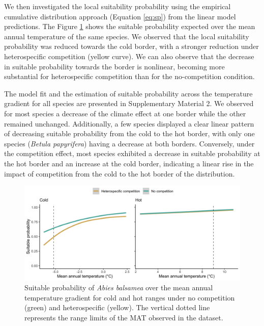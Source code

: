 We then investigated the local suitability probability using the
empirical cumulative distribution approach (Equation \ref{eq:sp}) from
the linear model predictions. The Figure \ref{fig:sp-example} shows the
suitable probability expected over the mean annual temperature of the
same species. We observed that the local suitability probability was
reduced towards the cold border, with a stronger reduction under
heterospecific competition (yellow curve). We can also observe that the
decrease in suitable probability towards the border is nonlinear,
becoming more substantial for heterospecific competition than for the
no-competition condition.

The model fit and the estimation of suitable probability across the
temperature gradient for all species are presented in Supplementary
Material 2. We observed for most species a decrease of the climate
effect at one border while the other remained unchanged. Additionally, a
few species displayed a clear linear pattern of decreasing suitable
probability from the cold to the hot border, with only one species
(\emph{Betula papyrifera}) having a decrease at both borders.
Conversely, under the competition effect, most species exhibited a
decrease in suitable probability at the hot border and an increase at
the cold border, indicating a linear rise in the impact of competition
from the cold to the hot border of the distribution.

\hypertarget{fig:sp-example}{%
\begin{figure}
\centering
\includegraphics[width=1\textwidth,height=\textheight]{manuscript/figs/fig-sp-example-1.png}
\caption[{Suitable probability of \emph{Abies balsamea} over the mean
annual temperature gradient for cold and hot ranges under no competition
(green) and heterospecific (yellow).}]{Suitable probability of
\emph{Abies balsamea} over the mean annual temperature gradient for cold
and hot ranges under no competition (green) and heterospecific (yellow).
The vertical dotted line represents the range limits of the MAT observed
in the dataset.}
\label{fig:sp-example}
\end{figure}
}

